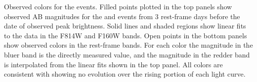Observed colors for the \spock events.  Filled points plotted in the
top panels show observed AB magnitudes for the \spockone and \spocktwo
events from 3 rest-frame days before the date of observed peak
brightness.  Solid lines and shaded regions show linear fits to the
data in the F814W and F160W bands.  Open points in the bottom panels
show observed colors in the rest-frame bands.  For each color the
magnitude in the bluer band is the directly measured value, and the
magnitude in the redder band is interpolated from the linear fits
shown in the top panel.  All colors are consistent with showing no
evolution over the rising portion of each light curve.
\label{fig:ColorCurves}
